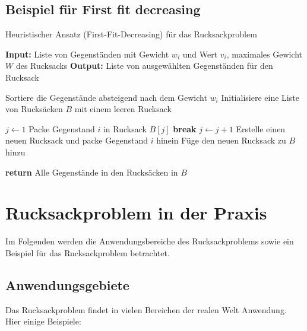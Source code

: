 \documentclass[12pt]{report}
\begin{document}
\section{Beispiel für First fit decreasing}
\begin{algorithm}
	\caption{Heuristischer Ansatz (First-Fit-Decreasing) für das Rucksackproblem}
	\begin{algorithmic}[1]
		\State \textbf{Input:} Liste von Gegenständen mit Gewicht $w_i$ und Wert $v_i$, maximales Gewicht $W$ des Rucksacks
		\State \textbf{Output:} Liste von ausgewählten Gegenständen für den Rucksack
		
		\State Sortiere die Gegenstände absteigend nach dem Gewicht $w_i$
		\State Initialisiere eine Liste von Rucksäcken $B$ mit einem leeren Rucksack
		
		\State $j \gets 1$
		\State Packe Gegenstand $i$ in Rucksack $B[j]$
		\State \textbf{break}
		\EndIf
		\State $j \gets j + 1$
		\EndWhile
		\State Erstelle einen neuen Rucksack und packe Gegenstand $i$ hinein
		\State Füge den neuen Rucksack zu $B$ hinzu
		\EndIf
		\EndFor
		
		\State \textbf{return} Alle Gegenstände in den Rucksäcken in $B$
	\end{algorithmic}
\end{algorithm}


\pagebreak
\chapter{Rucksackproblem in der Praxis}
	Im Folgenden werden die Anwendungsbereiche des Rucksackproblems sowie ein Beispiel für das Rucksackproblem betrachtet.
	
	\section{Anwendungsgebiete}
	Das Rucksackproblem findet in vielen Bereichen der realen Welt Anwendung. Hier einige Beispiele:
	
\end{document}
